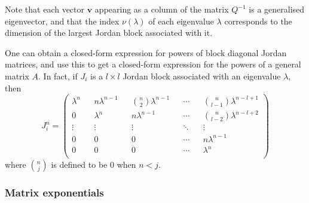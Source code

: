 \documentclass[format=acmsmall, review=false, screen=true]{acmart}
\newcommand{\myvector}{\boldsymbol}
\begin{document}
Note that each vector $\myvector{v}$ appearing as a column of the
matrix $Q^{-1}$ is a generalised eigenvector, and that the
index $\nu(\lambda)$ of each eigenvalue $\lambda$ corresponds to the
dimension of the largest Jordan block associated with it.

One can obtain a closed-form expression for powers of block diagonal
Jordan matrices, and use this to get a closed-form expression for
the powers of a general matrix $A$. In fact, if $J_{i}$ is a
$l\times l$ Jordan block associated with an eigenvalue $\lambda$,
then
\begin{equation}
\label{eq:jordan_powers}
J_{i}^{n}=\begin{pmatrix}
\lambda^{n}	&&	n\lambda^{n-1}	&&	{n\choose 2}\lambda^{n-1}	&&
\cdots		&&	{n\choose l-1}\lambda^{n-l+1}				\\
0			&&	\lambda^{n}		&&	n\lambda^{n-1}				&&
\cdots		&&	{n\choose l-2}\lambda^{n-l+2}				\\
\vdots	&&	\vdots	&&	\vdots	&&	\ddots	&&	\vdots			\\
0		&&	0		&&	0		&&	\cdots	&&	n\lambda^{n-1}	\\
0		&&	0		&&	0		&&	\cdots	&&	\lambda^{n}		\\
\end{pmatrix}
\end{equation}
where ${n\choose j}$ is defined to be $0$ when $n<j$.

\subsubsection{Matrix exponentials}
\label{sec:matrix_exp}
\end{document}
